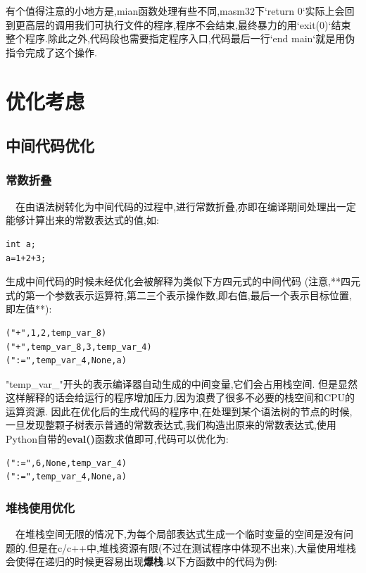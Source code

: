 \documentclass{article}
\begin{document}
有个值得注意的小地方是,mian函数处理有些不同,masm32下`return 0`实际上会回到更高层的调用我们可执行文件的程序,程序不会结束,最终暴力的用`exit(0)`结束整个程序.除此之外,代码段也需要指定程序入口,代码最后一行`end main`就是用伪指令完成了这个操作.

\section{优化考虑}

\subsection{中间代码优化}

\subsubsection{常数折叠}

\quad\ \ 在由语法树转化为中间代码的过程中,进行常数折叠,亦即在编译期间处理出一定能够计算出来的常数表达式的值,如:

\begin{verbatim}
int a;
a=1+2+3;
\end{verbatim}

生成中间代码的时候未经优化会被解释为类似下方四元式的中间代码
(注意,**四元式的第一个参数表示运算符,第二三个表示操作数,即右值,最后一个表示目标位置,即左值**):

\begin{verbatim}
("+",1,2,temp_var_8)
("+",temp_var_8,3,temp_var_4)
(":=",temp_var_4,None,a)
\end{verbatim}

"temp\_var\_"开头的表示编译器自动生成的中间变量,它们会占用栈空间.
但是显然这样解释的话会给运行的程序增加压力,因为浪费了很多不必要的栈空间和CPU的运算资源.
因此在优化后的生成代码的程序中,在处理到某个语法树的节点的时候,一旦发现整颗子树表示普通的常数表达式,我们构造出原来的常数表达式,使用Python自带的\textbf{eval()}函数求值即可,代码可以优化为:

\begin{verbatim}
(":=",6,None,temp_var_4)
(":=",temp_var_4,None,a)
\end{verbatim}


\subsubsection{堆栈使用优化}

\quad\ \ 在堆栈空间无限的情况下,为每个局部表达式生成一个临时变量的空间是没有问题的.但是在c/c++中,堆栈资源有限(不过在测试程序中体现不出来),大量使用堆栈会使得在递归的时候更容易出现\textbf{爆栈}.以下方函数中的代码为例:
\end{document}
